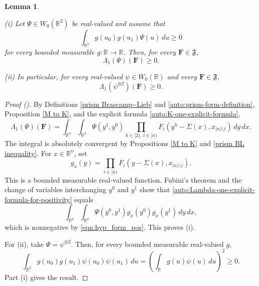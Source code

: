\documentclass[12pt,reqno]{amsart}
\newcommand{\auto}{{({\tiny\faCar})}}
\theoremstyle{plain}
\newtheorem{lemma}[theorem]{Lemma}
\numberwithin{equation}{section}
\theoremstyle{remark}
\newcommand{\uses}[1]{}
\newcommand{\usesdefs}[1]{}
\newcommand{\leanok}{}
\newcommand{\lean}[1]{}
\newcommand{\R}{{\mathbb R}}
\newcommand{\F}{\mathbf{F}}
\begin{document}
\begin{lemma}\label{lem:form_pos}\uses{M to K,prism BL inequality}\usesdefs{auto:Wiener-space-definition,normalized function tuples,prism Brascamp--Lieb,auto:prism-form-definition}
\lean{Auto.formPos}
\leanok
(i) Let $\Psi\in W_0(\R^2)$ be real-valued and assume that
\begin{equation}\label{eqn:hyp_form_pos}
\int_{\R^2}g(u_0)g(u_1)\Psi(u)\,du\ge0
\end{equation}
for every bounded measurable $g:\R\to\R$. Then, for every $\F\in\mathfrak F$,
\begin{equation}\label{auto:distributional-prism-positivity}
\Lambda_1(\Psi)(\F)\ge0.
\end{equation}

(ii) In particular, for every real-valued $\psi\in W_0(\R)$ and every $\F\in\mathfrak F$,
\begin{equation}\label{form_pos_psipsi}
\Lambda_1(\psi^{\otimes2})(\F)\ge0.
\end{equation}
\end{lemma}

\begin{proof}[Proof \auto]
By Definitions \ref{prism Brascamp--Lieb} and \ref{auto:prism-form-definition}, Proposition \ref{M to K}, and the explicit formula \eqref{auto:K-one-explicit-formula},
\begin{equation}\label{auto:Lambda-one-explicit-formula-for-positivity}
\Lambda_1(\Psi)(\F)
=
\int_{\R^n}\int_{\R^2}
\Psi(y^1,y^0)
\prod_{h\in[2),\,i\in[n)}
F_i(y^h-\Sigma(x),x_{[n)\setminus i})
\,dy\,dx.
\end{equation}
The integral is absolutely convergent by Propositions \ref{M to K} and \ref{prism BL inequality}. For $x\in\R^n$, set
\begin{equation}\label{auto:Lambda-one-positivity-test-function}
g_x(y)=\prod_{i\in[n)}F_i(y-\Sigma(x),x_{[n)\setminus i}).
\end{equation}
This is a bounded measurable real-valued function. Fubini's theorem and the change of variables interchanging $y^0$ and $y^1$ show that \eqref{auto:Lambda-one-explicit-formula-for-positivity} equals
\begin{equation}\label{auto:Lambda-one-positive-fiber-integral}
\int_{\R^n}\int_{\R^2}
\Psi(y^0,y^1)g_x(y^0)g_x(y^1)\,dy\,dx,
\end{equation}
which is nonnegative by \eqref{eqn:hyp_form_pos}. This proves (i).

For (ii), take $\Psi=\psi^{\otimes2}$. Then, for every bounded measurable real-valued $g$,
\begin{equation}\label{auto:tensor-square-kernel-positivity}
\int_{\R^2}g(u_0)g(u_1)\psi(u_0)\psi(u_1)\,du
=
\left(\int_\R g(u)\psi(u)\,du\right)^2
\ge0.
\end{equation}
Part (i) gives the result.
\end{proof}
\end{document}

